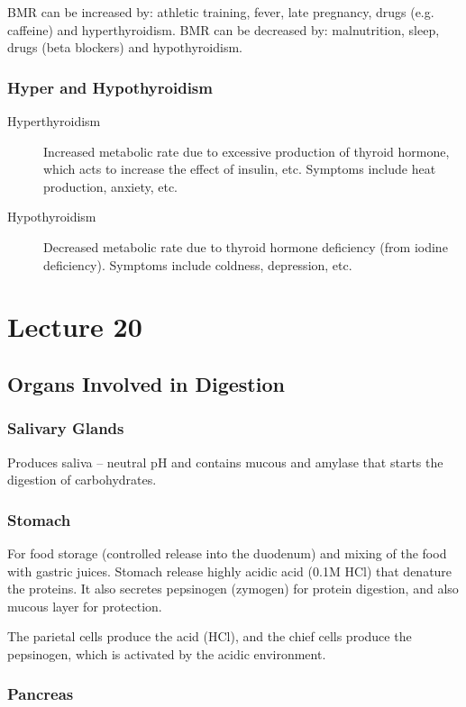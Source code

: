 \documentclass[a4paper, 12pt]{report}
\newcommand{\mychapter}[2]{
    \setcounter{chapter}{#1}
    \setcounter{section}{0}
    \chapter*{#2}
    \addcontentsline{toc}{chapter}{#2}
}
\begin{document}
BMR can be increased by: athletic training, fever, late pregnancy, drugs (e.g. caffeine) and hyperthyroidism.
BMR can be decreased by: malnutrition, sleep, drugs (beta blockers) and hypothyroidism.

\subsection{Hyper and Hypothyroidism}

\begin{description}
\item [Hyperthyroidism] Increased metabolic rate due to excessive production of thyroid hormone, which acts to increase the effect of insulin, etc. Symptoms include heat production, anxiety, etc.
\item [Hypothyroidism] Decreased metabolic rate due to thyroid hormone deficiency (from iodine deficiency). Symptoms include coldness, depression, etc.
\end{description}

\mychapter{20}{Lecture 20}

\section{Organs Involved in Digestion}

\subsection{Salivary Glands}

Produces saliva -- neutral pH and contains mucous and amylase that starts the digestion of carbohydrates.

\subsection{Stomach}

For food storage (controlled release into the duodenum) and mixing of the food with gastric juices.
Stomach release highly acidic acid (0.1M HCl) that denature the proteins.
It also secretes pepsinogen (zymogen) for protein digestion, and also mucous layer for protection.

The parietal cells produce the acid (HCl), and the chief cells produce the pepsinogen, which is activated by the acidic environment.

\subsection{Pancreas}
\end{document}
